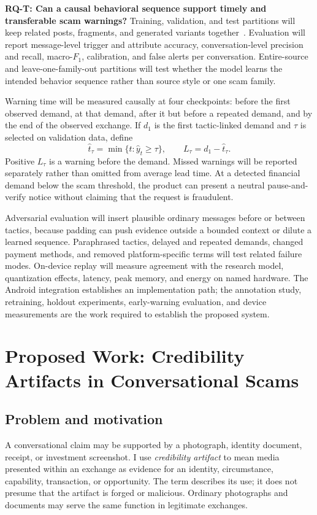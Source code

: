 \documentclass[letterpaper,11pt]{article}
\newcommand{\researchquestion}[1]{\par\medskip\noindent\textbf{#1}\quad}
\begin{document}
\researchquestion{RQ-T: Can a causal behavioral sequence support timely and
transferable scam warnings?}
Training, validation, and test partitions will keep related posts, fragments, and
generated variants together~\cite{cawley2010overfitting,varma2006bias}. Evaluation
will report message-level trigger and attribute accuracy, conversation-level
precision and recall, macro-$F_1$, calibration, and false alerts per conversation.
Entire-source and leave-one-family-out partitions will test whether the model
learns the intended behavior sequence rather than source style or one scam family.

Warning time will be measured causally at four checkpoints: before the first
observed demand, at that demand, after it but before a repeated demand, and by the
end of the observed exchange. If $d_1$ is the first tactic-linked demand and
$\tau$ is selected on validation data, define
\begin{equation}
 \hat t_\tau=\min\{t:\hat y_t\geq\tau\},\qquad
 L_\tau=d_1-\hat t_\tau.
 \label{eq:lead}
\end{equation}
Positive $L_\tau$ is a warning before the demand. Missed warnings will be reported
separately rather than omitted from average lead time. At a detected financial
demand below the scam threshold, the product can present a neutral pause-and-verify
notice without claiming that the request is fraudulent.

Adversarial evaluation will insert plausible ordinary messages before or between
tactics, because padding can push evidence outside a bounded context or dilute a
learned sequence. Paraphrased tactics, delayed and repeated demands, changed
payment methods, and removed platform-specific terms will test related failure
modes. On-device replay will measure agreement with the research model,
quantization effects, latency, peak memory, and energy on named hardware. The
Android integration establishes an implementation path; the annotation study,
retraining, holdout experiments, early-warning evaluation, and device measurements
are the work required to establish the proposed system.


\section{Proposed Work: Credibility Artifacts in Conversational Scams}
\label{sec:proposed}
\subsection{Problem and motivation}
A conversational claim may be supported by a photograph, identity document,
receipt, or investment screenshot. I use \emph{credibility artifact} to mean
media presented within an exchange as evidence for an identity, circumstance,
capability, transaction, or opportunity. The term describes its use; it does not
presume that the artifact is forged or malicious. Ordinary photographs and
documents may serve the same function in legitimate exchanges.
\end{document}
